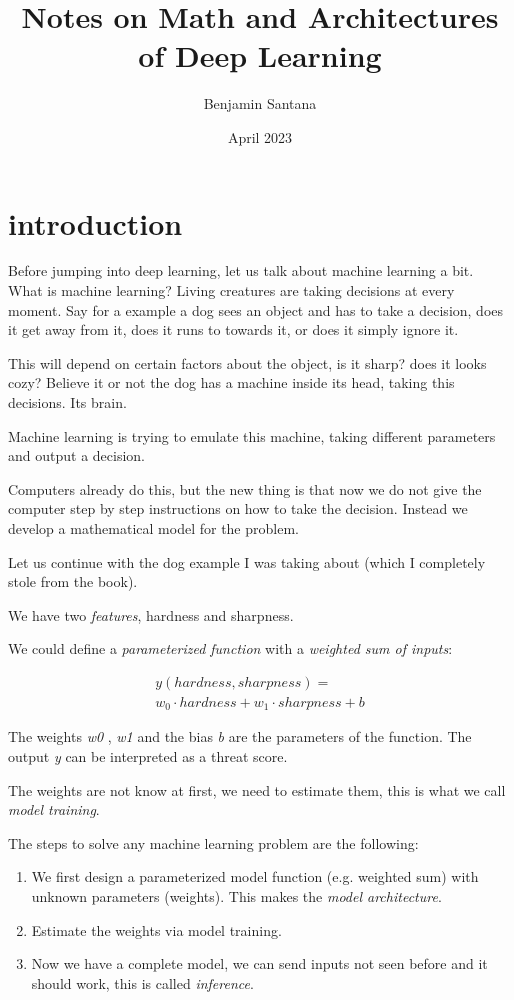 \documentclass[twocolumn]{article}
\title{Notes on Math and Architectures of Deep Learning}
\author{Benjamin Santana}
\date{April 2023}
\begin{document}
   \maketitle

\section{introduction}

Before jumping into deep learning, let us talk about machine learning a bit.
What is machine learning? Living creatures are taking decisions at every moment.
Say for a example a dog sees an object and has to take a decision, does it get
away from it, does it runs to towards it, or does it simply ignore it.

This will depend on certain factors about the object, is it sharp? does it
looks cozy? Believe it or not the dog has a machine inside its head, taking
this decisions. Its brain.

Machine learning is trying to emulate this machine, taking different parameters
and output a decision.

Computers already do this, but the new thing is that now we do not give the
computer step by step instructions on how to take the decision. Instead we
develop a mathematical model for the problem.

Let us continue with the dog example I was taking about (which I completely
stole from the book).

We have two \emph{features}, hardness and sharpness.

We could define a \emph{parameterized function} with a \emph{weighted sum of
inputs}:

\noindent
\begin{multline}
    y(hardness, sharpness) = \\ w_0 \cdot hardness + w_1 \cdot sharpness + b
\end{multline}

The weights \emph{w0} , \emph{w1} and the bias \emph{b} are the parameters of
the function. The output \emph{y} can be interpreted as a threat score.

The weights are not know at first, we need to estimate them, this is what we
call \emph{model training}.

The steps to solve any machine learning problem are the following:
\begin{enumerate}
    \item We first design a parameterized model function (e.g. weighted sum)
        with unknown parameters (weights). This makes the \emph{model
        architecture}.
    \item Estimate the weights via model training.
    \item Now we have a complete model, we can send inputs not seen before and
        it should work, this is called \emph{inference}.
\end{enumerate}
\end{document}

